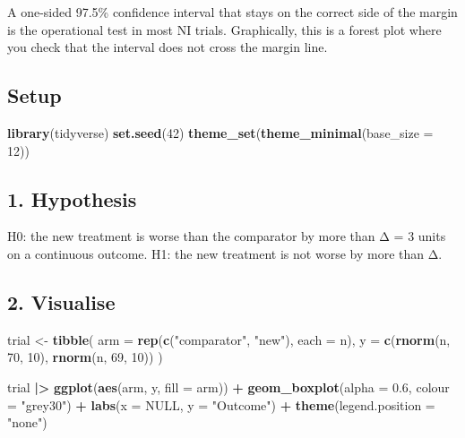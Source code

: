 \documentclass[
]{article}
\newenvironment{Shaded}{\begin{snugshade}}{\end{snugshade}}
\newcommand{\AttributeTok}[1]{\textcolor[rgb]{0.13,0.29,0.53}{#1}}
\newcommand{\ConstantTok}[1]{\textcolor[rgb]{0.56,0.35,0.01}{#1}}
\newcommand{\DecValTok}[1]{\textcolor[rgb]{0.00,0.00,0.81}{#1}}
\newcommand{\FloatTok}[1]{\textcolor[rgb]{0.00,0.00,0.81}{#1}}
\newcommand{\FunctionTok}[1]{\textcolor[rgb]{0.13,0.29,0.53}{\textbf{#1}}}
\newcommand{\NormalTok}[1]{#1}
\newcommand{\OtherTok}[1]{\textcolor[rgb]{0.56,0.35,0.01}{#1}}
\newcommand{\SpecialCharTok}[1]{\textcolor[rgb]{0.81,0.36,0.00}{\textbf{#1}}}
\newcommand{\StringTok}[1]{\textcolor[rgb]{0.31,0.60,0.02}{#1}}
\begin{document}
A one-sided 97.5\% confidence interval that stays on the correct side of
the margin is the operational test in most NI trials. Graphically, this
is a forest plot where you check that the interval does not cross the
margin line.

\subsection{Setup}\label{setup}

\begin{Shaded}
\begin{Highlighting}[]
\FunctionTok{library}\NormalTok{(tidyverse)}
\FunctionTok{set.seed}\NormalTok{(}\DecValTok{42}\NormalTok{)}
\FunctionTok{theme\_set}\NormalTok{(}\FunctionTok{theme\_minimal}\NormalTok{(}\AttributeTok{base\_size =} \DecValTok{12}\NormalTok{))}
\end{Highlighting}
\end{Shaded}

\subsection{1. Hypothesis}\label{hypothesis}

H0: the new treatment is worse than the comparator by more than Δ = 3
units on a continuous outcome. H1: the new treatment is not worse by
more than Δ.

\subsection{2. Visualise}\label{visualise}

\begin{Shaded}
\begin{Highlighting}[]
\NormalTok{trial }\OtherTok{\textless{}{-}} \FunctionTok{tibble}\NormalTok{(}
  \AttributeTok{arm =} \FunctionTok{rep}\NormalTok{(}\FunctionTok{c}\NormalTok{(}\StringTok{"comparator"}\NormalTok{, }\StringTok{"new"}\NormalTok{), }\AttributeTok{each =}\NormalTok{ n),}
  \AttributeTok{y   =} \FunctionTok{c}\NormalTok{(}\FunctionTok{rnorm}\NormalTok{(n, }\DecValTok{70}\NormalTok{, }\DecValTok{10}\NormalTok{), }\FunctionTok{rnorm}\NormalTok{(n, }\DecValTok{69}\NormalTok{, }\DecValTok{10}\NormalTok{))}
\NormalTok{)}

\NormalTok{trial }\SpecialCharTok{|\textgreater{}}
  \FunctionTok{ggplot}\NormalTok{(}\FunctionTok{aes}\NormalTok{(arm, y, }\AttributeTok{fill =}\NormalTok{ arm)) }\SpecialCharTok{+}
  \FunctionTok{geom\_boxplot}\NormalTok{(}\AttributeTok{alpha =} \FloatTok{0.6}\NormalTok{, }\AttributeTok{colour =} \StringTok{"grey30"}\NormalTok{) }\SpecialCharTok{+}
  \FunctionTok{labs}\NormalTok{(}\AttributeTok{x =} \ConstantTok{NULL}\NormalTok{, }\AttributeTok{y =} \StringTok{"Outcome"}\NormalTok{) }\SpecialCharTok{+}
  \FunctionTok{theme}\NormalTok{(}\AttributeTok{legend.position =} \StringTok{"none"}\NormalTok{)}
\end{Highlighting}
\end{Shaded}
\end{document}
